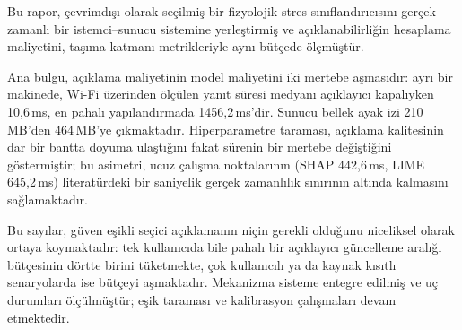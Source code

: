 \documentclass[conference]{IEEEtran}
\newcommand{\ms}{\,ms\xspace}
\begin{document}
Bu rapor, çevrimdışı olarak seçilmiş bir fizyolojik stres sınıflandırıcısını
gerçek zamanlı bir istemci--sunucu sistemine yerleştirmiş ve açıklanabilirliğin
hesaplama maliyetini, taşıma katmanı metrikleriyle aynı bütçede ölçmüştür.

Ana bulgu, açıklama maliyetinin model maliyetini iki mertebe aşmasıdır: ayrı bir
makinede, Wi-Fi üzerinden ölçülen yanıt süresi medyanı açıklayıcı kapalıyken
10{,}6\ms, en pahalı yapılandırmada 1456{,}2\ms'dir. Sunucu bellek ayak izi
210\,MB'den 464\,MB'ye çıkmaktadır. Hiperparametre taraması, açıklama kalitesinin
dar bir bantta doyuma ulaştığını fakat sürenin bir mertebe değiştiğini
göstermiştir; bu asimetri, ucuz çalışma noktalarının (SHAP 442{,}6\ms, LIME
645{,}2\ms) literatürdeki bir saniyelik gerçek zamanlılık sınırının altında
kalmasını sağlamaktadır.

Bu sayılar, güven eşikli seçici açıklamanın niçin gerekli olduğunu niceliksel
olarak ortaya koymaktadır: tek kullanıcıda bile pahalı bir açıklayıcı güncelleme
aralığı bütçesinin dörtte birini tüketmekte, çok kullanıcılı ya da kaynak
kısıtlı senaryolarda ise bütçeyi aşmaktadır. Mekanizma sisteme entegre edilmiş ve
uç durumları ölçülmüştür; eşik taraması ve kalibrasyon çalışmaları devam
etmektedir.
\end{document}
